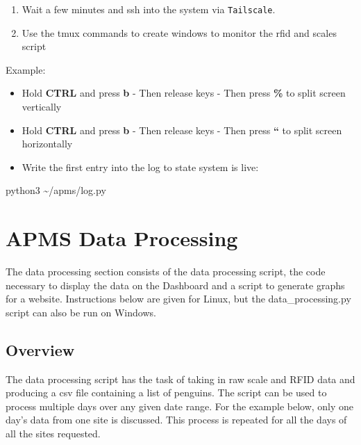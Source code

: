 \documentclass[
  letterpaper,
]{scrbook}
\newenvironment{Shaded}{\begin{snugshade}}{\end{snugshade}}
\newcommand{\ExtensionTok}[1]{\textcolor[rgb]{0.00,0.23,0.31}{#1}}
\newcommand{\NormalTok}[1]{\textcolor[rgb]{0.00,0.23,0.31}{#1}}
\providecommand{\tightlist}{%
  \setlength{\itemsep}{0pt}\setlength{\parskip}{0pt}}
\begin{document}
\begin{enumerate}
\def\labelenumi{\arabic{enumi}.}
\setcounter{enumi}{2}
\tightlist
\item
  Wait a few minutes and ssh into the system via \texttt{Tailscale}.
\item
  Use the tmux commands to create windows to monitor the rfid and scales
  script
\end{enumerate}

Example:

\begin{itemize}
\item
  Hold \textbf{CTRL} and press \textbf{b} - Then release keys - Then
  press \textbf{\%} to split screen vertically
\item
  Hold \textbf{CTRL} and press \textbf{b} - Then release keys - Then
  press \textbf{``} to split screen horizontally
\item
  Write the first entry into the log to state system is live:
\end{itemize}

\begin{Shaded}
\begin{Highlighting}[]
\ExtensionTok{python3}\NormalTok{ \textasciitilde{}/apms/log.py}
\end{Highlighting}
\end{Shaded}

\chapter{APMS Data Processing}\label{apms-data-processing}

The data processing section consists of the data processing script, the
code necessary to display the data on the Dashboard and a script to
generate graphs for a website. Instructions below are given for Linux,
but the data\_processing.py script can also be run on Windows.

\section{Overview}\label{overview-5}

The data processing script has the task of taking in raw scale and RFID
data and producing a csv file containing a list of penguins. The script
can be used to process multiple days over any given date range. For the
example below, only one day's data from one site is discussed. This
process is repeated for all the days of all the sites requested.
\end{document}
